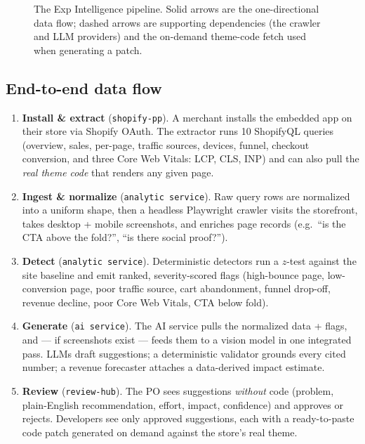 \documentclass[11pt,a4paper]{article}
\begin{document}
\begin{figure}[h]
{%
}
\caption{The Exp Intelligence pipeline. Solid arrows are the one-directional
data flow; dashed arrows are supporting dependencies (the crawler and LLM
providers) and the on-demand theme-code fetch used when generating a patch.}
\label{fig:arch}
\end{figure}

\subsection{End-to-end data flow}

\begin{enumerate}[leftmargin=1.4em]
  \item \textbf{Install \& extract} (\texttt{shopify-pp}). A merchant installs
  the embedded app on their store via Shopify OAuth. The extractor runs 10
  ShopifyQL queries (overview, sales, per-page, traffic sources, devices,
  funnel, checkout conversion, and three Core Web Vitals: LCP, CLS, INP) and
  can also pull the \emph{real theme code} that renders any given page.
  \item \textbf{Ingest \& normalize} (\texttt{analytic service}). Raw query
  rows are normalized into a uniform shape, then a headless Playwright crawler
  visits the storefront, takes desktop + mobile screenshots, and enriches page
  records (e.g.\ ``is the CTA above the fold?'', ``is there social proof?'').
  \item \textbf{Detect} (\texttt{analytic service}). Deterministic detectors
  run a $z$-test against the site baseline and emit ranked, severity-scored
  flags (high-bounce page, low-conversion page, poor traffic source, cart
  abandonment, funnel drop-off, revenue decline, poor Core Web Vitals, CTA
  below fold).
  \item \textbf{Generate} (\texttt{ai service}). The AI service pulls the
  normalized data + flags, and --- if screenshots exist --- feeds them to a
  vision model in one integrated pass. LLMs draft suggestions; a deterministic
  validator grounds every cited number; a revenue forecaster attaches a
  data-derived impact estimate.
  \item \textbf{Review} (\texttt{review-hub}). The PO sees suggestions
  \emph{without} code (problem, plain-English recommendation, effort, impact,
  confidence) and approves or rejects. Developers see only approved
  suggestions, each with a ready-to-paste code patch generated on demand
  against the store's real theme.
\end{enumerate}
\end{document}
